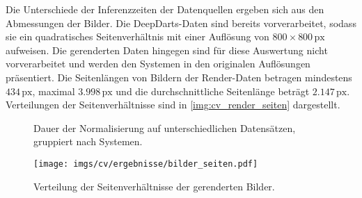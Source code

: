 Die Unterschiede der Inferenzzeiten der Datenquellen ergeben sich aus den Abmessungen der Bilder. Die DeepDarts-Daten sind bereits vorverarbeitet, sodass sie ein quadratisches Seitenverhältnis mit einer Auflösung von $800 \times 800\,\text{px}$ aufweisen. Die gerenderten Daten hingegen sind für diese Auswertung nicht vorverarbeitet und werden den Systemen in den originalen Auflösungen präsentiert. Die Seitenlängen von Bildern der Render-Daten betragen mindestens $434\,\text{px}$, maximal $3.998\,\text{px}$ und die durchschnittliche Seitenlänge beträgt $2.147\,\text{px}$. Verteilungen der Seitenverhältnisse sind in \autoref{img:cv_render_seiten} dargestellt.

\begin{figure}
    \centering
    \caption{Dauer der Normalisierung auf unterschiedlichen Datensätzen, gruppiert nach Systemen.}
    \label{fig:cv_dauer}
\end{figure}

\begin{figure}
    \centering
    \texttt{[image: imgs/cv/ergebnisse/bilder\_seiten.pdf]}
    \caption{Verteilung der Seitenverhältnisse der gerenderten Bilder.}
    \label{img:cv_render_seiten}
\end{figure}

